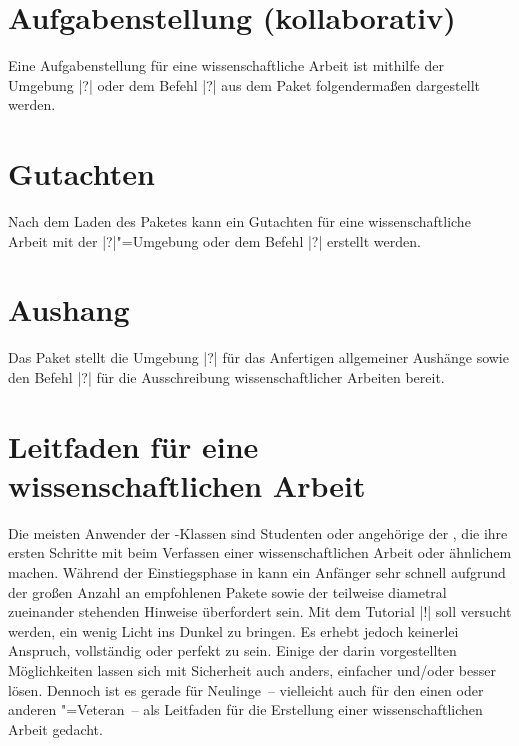 \begin{Bundle}{}
\section{Aufgabenstellung (kollaborativ)}
\label{sec:exmpl:task}
%
%
Eine Aufgabenstellung für eine wissenschaftliche Arbeit ist mithilfe der 
Umgebung |?| oder dem Befehl |?| aus dem 
Paket  folgendermaßen dargestellt werden.

\section{Gutachten}
\label{sec:exmpl:evaluation}
%
Nach dem Laden des Paketes  kann ein Gutachten für 
eine wissenschaftliche Arbeit mit der |?|"=Umgebung 
oder dem Befehl |?| erstellt werden.

\section{Aushang}
\label{sec:exmpl:notice}
%
Das Paket  stellt die Umgebung |?|
für das Anfertigen allgemeiner Aushänge sowie den Befehl |?|
für die Ausschreibung wissenschaftlicher Arbeiten bereit.
%
\end{Bundle}

\section{Leitfaden für eine wissenschaftlichen Arbeit}
\label{sec:exmpl:treatise}
%
%
Die meisten Anwender der \TUDScript-Klassen sind Studenten oder angehörige der 
\TnUD, die ihre ersten Schritte mit  beim Verfassen einer 
wissenschaftlichen Arbeit oder ähnlichem machen. Während der Einstiegsphase in 
 kann ein Anfänger sehr schnell aufgrund der großen Anzahl an 
empfohlenen Pakete sowie der teilweise diametral zueinander stehenden Hinweise 
überfordert sein. Mit dem Tutorial |!| soll versucht werden, 
ein wenig Licht ins Dunkel zu bringen. Es erhebt jedoch keinerlei Anspruch, 
vollständig oder perfekt zu sein. Einige der darin vorgestellten Möglichkeiten 
lassen sich mit Sicherheit auch anders, einfacher und/oder besser lösen. 
Dennoch ist es gerade für Neulinge~-- vielleicht auch für den einen oder 
anderen "=Veteran~-- als Leitfaden für die Erstellung einer 
wissenschaftlichen Arbeit gedacht.

